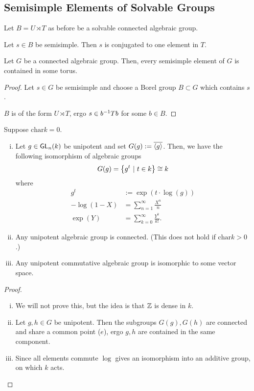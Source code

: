 \subsection{Semisimple Elements of Solvable Groups}
\begin{theorem}
	Let $B = U \rtimes T$ as before be a solvable connected algebraic group.
	
	Let $s \in B$ be semisimple. Then $s$ is conjugated to one element in $T$.
\end{theorem}
\begin{corollary}
	Let $G$ be a connected algebraic group. Then, every semisimple element of $G$ is contained in some torus.
\end{corollary}
\begin{proof}
	Let $s \in G$ be semisimple and choose a Borel group $B \subset G$ which contains $s$.
	
	$B$ is of the form $U \rtimes T$, ergo $s \in b^{-1} T b$ for some $b \in B$.
\end{proof}

\begin{lemma}
	Suppose $\mathrm{char} k = 0$.
	\begin{enumerate}[(i)]
		\item Let $g \in \textsf{GL}_n(k)$ be unipotent and set $G(g) := \overline{\left<g\right>}$. Then, we have the following isomorphism of algebraic groups
		\[ G(g) = \left\lbrace g^t ~ | ~ t \in k\right\rbrace \overset{}{\cong} k \]
		where
		\begin{align*}
		g^t &:= \exp( t \cdot \log(g))\\
		-\log(1 - X) &= \sum_{n = 1}^\infty \frac{X^n}{n}\\
		\exp(Y) &= \sum_{k = 0}^\infty \frac{Y^k}{k!}.
		\end{align*}
		
		\item Any unipotent algebraic group is connected. (This does not hold if $\mathrm{char} k > 0$.)
		\item Any unipotent commutative algebraic group is isomorphic to some vector space.
	\end{enumerate}
\end{lemma}
\begin{proof}
		\begin{enumerate}[(i)]
		\item We will not prove this, but the idea is that $\mathbb{Z}$ is dense in $k$.
		\item Let $g,h \in G$ be unipotent. Then the subgroups $G(g), G(h)$ are connected and share a common point ($e$), ergo $g,h$ are contained in the same component.
		\item Since all elements commute $\log$ gives an isomorphism into an additive group, on which $k$ acts.
	\end{enumerate}
\end{proof}

